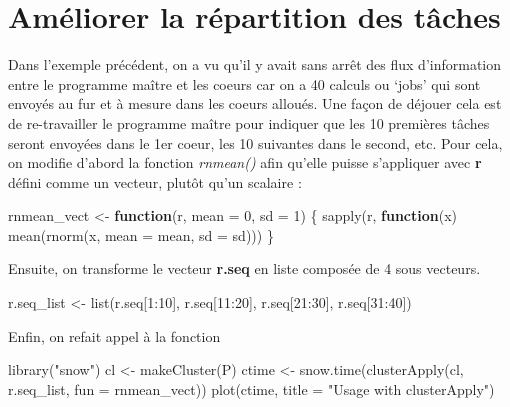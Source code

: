 \documentclass[
]{book}
\newenvironment{Shaded}{\begin{snugshade}}{\end{snugshade}}
\newcommand{\AttributeTok}[1]{\textcolor[rgb]{0.77,0.63,0.00}{#1}}
\newcommand{\ControlFlowTok}[1]{\textcolor[rgb]{0.13,0.29,0.53}{\textbf{#1}}}
\newcommand{\DecValTok}[1]{\textcolor[rgb]{0.00,0.00,0.81}{#1}}
\newcommand{\FunctionTok}[1]{\textcolor[rgb]{0.00,0.00,0.00}{#1}}
\newcommand{\NormalTok}[1]{#1}
\newcommand{\OtherTok}[1]{\textcolor[rgb]{0.56,0.35,0.01}{#1}}
\newcommand{\SpecialCharTok}[1]{\textcolor[rgb]{0.00,0.00,0.00}{#1}}
\newcommand{\StringTok}[1]{\textcolor[rgb]{0.31,0.60,0.02}{#1}}
\theoremstyle{definition}
\theoremstyle{definition}
\theoremstyle{definition}
\theoremstyle{definition}
\theoremstyle{remark}
\begin{document}
\hypertarget{amuxe9liorer-la-ruxe9partition-des-tuxe2ches}{%
\section{Améliorer la répartition des tâches}\label{amuxe9liorer-la-ruxe9partition-des-tuxe2ches}}

Dans l'exemple précédent, on a vu qu'il y avait sans arrêt des flux d'information entre le programme maître et les coeurs car on a 40 calculs ou `jobs' qui sont envoyés au fur et à mesure dans les coeurs alloués. Une façon de déjouer cela est de re-travailler le programme maître pour indiquer que les 10 premières tâches seront envoyées dans le 1er coeur, les 10 suivantes dans le second, etc. Pour cela, on modifie d'abord la fonction \emph{rnmean()} afin qu'elle puisse s'appliquer avec \textbf{r} défini comme un vecteur, plutôt qu'un scalaire :

\begin{Shaded}
\begin{Highlighting}[]
\NormalTok{rnmean\_vect }\OtherTok{\textless{}{-}} \ControlFlowTok{function}\NormalTok{(r, }\AttributeTok{mean =} \DecValTok{0}\NormalTok{, }\AttributeTok{sd =} \DecValTok{1}\NormalTok{) \{}
        \FunctionTok{sapply}\NormalTok{(r, }
         \ControlFlowTok{function}\NormalTok{(x) }\FunctionTok{mean}\NormalTok{(}\FunctionTok{rnorm}\NormalTok{(x, }\AttributeTok{mean =}\NormalTok{ mean, }\AttributeTok{sd =}\NormalTok{ sd)))}
\NormalTok{\}}
\end{Highlighting}
\end{Shaded}

Ensuite, on transforme le vecteur \textbf{r.seq} en liste composée de 4 sous vecteurs.

\begin{Shaded}
\begin{Highlighting}[]
\NormalTok{r.seq\_list }\OtherTok{\textless{}{-}} \FunctionTok{list}\NormalTok{(r.seq[}\DecValTok{1}\SpecialCharTok{:}\DecValTok{10}\NormalTok{],}
\NormalTok{                   r.seq[}\DecValTok{11}\SpecialCharTok{:}\DecValTok{20}\NormalTok{],}
\NormalTok{                   r.seq[}\DecValTok{21}\SpecialCharTok{:}\DecValTok{30}\NormalTok{],}
\NormalTok{                   r.seq[}\DecValTok{31}\SpecialCharTok{:}\DecValTok{40}\NormalTok{])}
\end{Highlighting}
\end{Shaded}

Enfin, on refait appel à la fonction

\begin{Shaded}
\begin{Highlighting}[]
\FunctionTok{library}\NormalTok{(}\StringTok{"snow"}\NormalTok{)}
\NormalTok{cl }\OtherTok{\textless{}{-}} \FunctionTok{makeCluster}\NormalTok{(P) }
\NormalTok{ctime }\OtherTok{\textless{}{-}} \FunctionTok{snow.time}\NormalTok{(}\FunctionTok{clusterApply}\NormalTok{(cl, r.seq\_list, }\AttributeTok{fun =}\NormalTok{ rnmean\_vect))}
\FunctionTok{plot}\NormalTok{(ctime, }\AttributeTok{title =} \StringTok{"Usage with clusterApply"}\NormalTok{)}
\end{Highlighting}
\end{Shaded}
\end{document}
